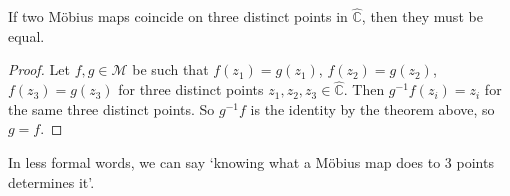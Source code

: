 \begin{corollary}
	If two M\"obius maps coincide on three distinct points in \(\hat{\mathbb C}\), then they must be equal.
\end{corollary}
\begin{proof}
	Let \(f, g \in \mathcal M\) be such that \(f(z_1) = g(z_1)\), \(f(z_2) = g(z_2)\), \(f(z_3) = g(z_3)\) for three distinct points \(z_1, z_2, z_3 \in \hat{\mathbb C}\).
	Then \(g^{-1}f(z_i) = z_i\) for the same three distinct points.
	So \(g^{-1}f\) is the identity by the theorem above, so \(g = f\).
\end{proof}
In less formal words, we can say `knowing what a M\"obius map does to 3 points determines it'.

